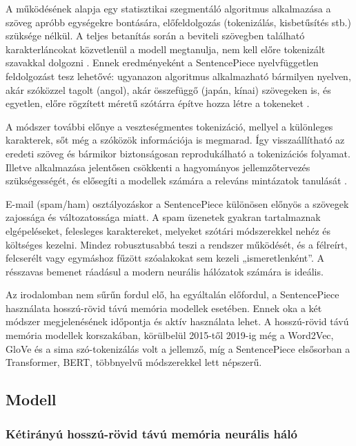 A működésének alapja egy statisztikai szegmentáló algoritmus alkalmazása a szöveg apróbb egységekre bontására, előfeldolgozás (tokenizálás, kisbetűsítés stb.)
 szüksége nélkül. A teljes betanítás során a beviteli szövegben található karakterláncokat közvetlenül a modell megtanulja, nem kell előre tokenizált szavakkal dolgozni
 . Ennek eredményeként a SentencePiece nyelvfüggetlen feldolgozást tesz lehetővé: ugyanazon algoritmus alkalmazható bármilyen nyelven, akár szóközzel tagolt (angol), akár összefüggő (japán, kínai) szövegeken is, és egyetlen, előre rögzített méretű szótárra építve hozza létre a tokeneket
 \cite{kudo-richardson-2018-sentencepiece}.

 A módszer további előnye a veszteségmentes tokenizáció, mellyel a különleges karakterek, sőt még a szóközök információja is megmarad. 
 Így visszaállítható az eredeti szöveg és bármikor biztonságosan reprodukálható a tokenizációs folyamat. 
 Illetve alkalmazása jelentősen csökkenti a hagyományos jellemzőtervezés szükségességét, és elősegíti a modellek számára a 
 releváns mintázatok tanulását \cite{kudo-richardson-2018-sentencepiece}.

 E-mail (spam/ham) osztályozáskor a SentencePiece különösen előnyös a szövegek zajossága és változatossága miatt. 
 A spam üzenetek gyakran tartalmaznak elgépeléseket, felesleges karaktereket, melyeket szótári módszerekkel nehéz 
 és költséges kezelni. Mindez robusztusabbá teszi a rendszer működését, és a félreírt, felcserélt vagy egymáshoz fűzött szóalakokat sem kezeli „ismeretlenként”. 
 A résszavas bemenet ráadásul a modern neurális hálózatok számára is ideális.

 Az irodalomban nem sűrűn fordul elő, ha egyáltalán előfordul, a SentencePiece használata hosszú-rövid távú memória modellek esetében. Ennek oka a két módszer 
megjelenésének időpontja és aktív használata lehet. A hosszú-rövid távú memória modellek korszakában, körülbelül 2015-től 2019-ig még a Word2Vec, 
GloVe és a sima szó-tokenizálás volt a jellemző, míg a SentencePiece elsősorban a Transformer, BERT, többnyelvű módszerekkel lett népszerű.

\subsection{Modell}

\subsubsection{Kétirányú hosszú-rövid távú memória neurális háló}


